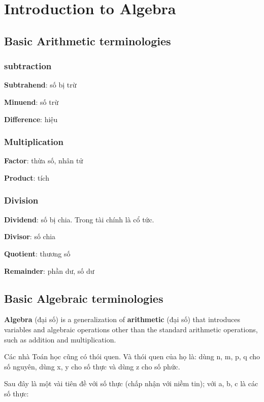 \chapter{Introduction to Algebra}

\section{Basic Arithmetic terminologies}

\subsection{subtraction}

\textbf{Subtrahend}: số bị trừ

\textbf{Minuend}: số trừ

\textbf{Difference}: hiệu

\subsection{Multiplication}

\textbf{Factor}: thừa số, nhân tử

\textbf{Product}: tích

\subsection{Division}

\textbf{Dividend}: số bị chia. Trong tài chính là cổ tức.

\textbf{Divisor}: số chia

\textbf{Quotient}: thương số

\textbf{Remainder}: phần dư, số dư

\section{Basic Algebraic terminologies}

\textbf{Algebra} (đại số) is a generalization of \textbf{arithmetic} (đại số) that introduces variables and algebraic operations other than the standard arithmetic operations, such as addition and multiplication.

\vspace{5mm}

Các nhà Toán học cũng có thói quen. Và thói quen của họ là: dùng n, m, p, q cho số nguyên, dùng x, y cho số thực và dùng z cho số phức.

Sau đây là một vài tiên đề với số thực (chấp nhận với niềm tin); với a, b, c là các số thực:

